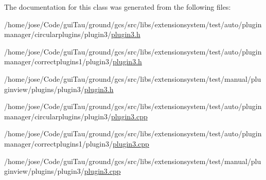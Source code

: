 The documentation for this class was generated from the following files\-:\begin{DoxyCompactItemize}
\item 
/home/jose/\-Code/gui\-Tau/ground/gcs/src/libs/extensionsystem/test/auto/pluginmanager/circularplugins/plugin3/\hyperlink{auto_2pluginmanager_2circularplugins_2plugin3_2plugin3_8h}{plugin3.\-h}\item 
/home/jose/\-Code/gui\-Tau/ground/gcs/src/libs/extensionsystem/test/auto/pluginmanager/correctplugins1/plugin3/\hyperlink{auto_2pluginmanager_2correctplugins1_2plugin3_2plugin3_8h}{plugin3.\-h}\item 
/home/jose/\-Code/gui\-Tau/ground/gcs/src/libs/extensionsystem/test/manual/pluginview/plugins/plugin3/\hyperlink{manual_2pluginview_2plugins_2plugin3_2plugin3_8h}{plugin3.\-h}\item 
/home/jose/\-Code/gui\-Tau/ground/gcs/src/libs/extensionsystem/test/auto/pluginmanager/circularplugins/plugin3/\hyperlink{auto_2pluginmanager_2circularplugins_2plugin3_2plugin3_8cpp}{plugin3.\-cpp}\item 
/home/jose/\-Code/gui\-Tau/ground/gcs/src/libs/extensionsystem/test/auto/pluginmanager/correctplugins1/plugin3/\hyperlink{auto_2pluginmanager_2correctplugins1_2plugin3_2plugin3_8cpp}{plugin3.\-cpp}\item 
/home/jose/\-Code/gui\-Tau/ground/gcs/src/libs/extensionsystem/test/manual/pluginview/plugins/plugin3/\hyperlink{manual_2pluginview_2plugins_2plugin3_2plugin3_8cpp}{plugin3.\-cpp}\end{DoxyCompactItemize}
